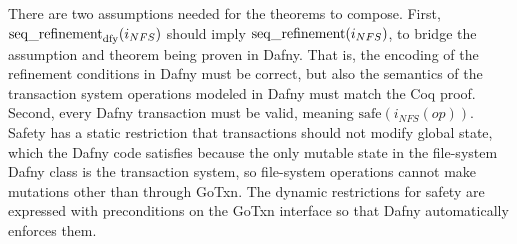 There are two assumptions needed for the theorems to compose. First,
$\operatorname{seq\_refinement}_{\mathrm{dfy}}(i_{NFS})$ should imply $\operatorname{seq\_refinement}(i_{NFS})$,
to bridge the assumption and theorem being proven in Dafny. That is, the
encoding of the refinement conditions in Dafny must be correct, but also the
semantics of the transaction system operations modeled in Dafny must match the
Coq proof. Second, every Dafny transaction must be valid, meaning
$\mathrm{safe}(i_{NFS}(op))$. Safety has a static restriction that transactions
should not modify global state, which the Dafny code satisfies because the only
mutable state in the file-system Dafny class is the transaction system, so
file-system operations cannot make mutations other than through GoTxn. The
dynamic restrictions for safety are expressed with preconditions on the GoTxn
interface so that Dafny automatically enforces them.

